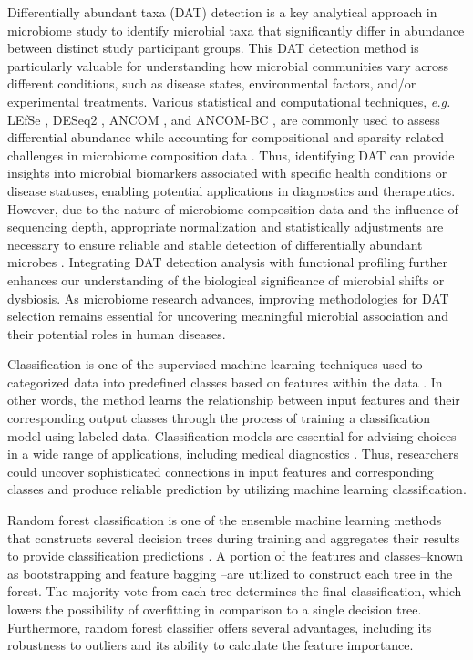 \documentclass[11pt, a4paper, onecolumn, oneside]{report}
\begin{document}
        Differentially abundant taxa (DAT) detection is a key analytical approach in microbiome study to identify microbial taxa that significantly differ in abundance between distinct study participant groups. This DAT detection method is particularly valuable for understanding how microbial communities vary across different conditions, such as disease states, environmental factors, and/or experimental treatments. Various statistical and computational techniques, \textit{e.g.} LEfSe \cite{LEfSe-1}, DESeq2 \cite{DESeq2-1}, ANCOM \cite{ANCOM-1}, and ANCOM-BC \cite{ANCOM-BC-1, ANCOM-BC-2}, are commonly used to assess differential abundance while accounting for compositional and sparsity-related challenges in microbiome composition data \cite{DAT-1, DAT-2}. Thus, identifying DAT can provide insights into microbial biomarkers associated with specific health conditions or disease statuses, enabling potential applications in diagnostics and therapeutics. However, due to the nature of microbiome composition data and the influence of sequencing depth, appropriate normalization and statistically adjustments are necessary to ensure reliable and stable detection of differentially abundant microbes \cite{DAT-3, DAT-4}. Integrating DAT detection analysis with functional profiling further enhances our understanding of the biological significance of microbial shifts or dysbiosis. As microbiome research advances, improving methodologies for DAT selection remains essential for uncovering meaningful microbial association and their potential roles in human diseases.

        Classification is one of the supervised machine learning techniques used to categorized data into predefined classes based on features within the data \cite{classification-1, classification-2}. In other words, the method learns the relationship between input features and their corresponding output classes through the process of training a classification model using labeled data. Classification models are essential for advising choices in a wide range of applications, including medical diagnostics \cite{classification-analysis-1}. Thus, researchers could uncover sophisticated connections in input features and corresponding classes and produce reliable prediction by utilizing machine learning classification.

        Random forest classification is one of the ensemble machine learning methods that constructs several decision trees during training and aggregates their results to provide classification predictions \cite{RF-1, RF-8}. A portion of the features and classes--known as bootstrapping \cite{RF-2, RF-3, RF-4} and feature bagging \cite{RF-5, RF-6, RF-7}--are utilized to construct each tree in the forest. The majority vote from each tree determines the final classification, which lowers the possibility of overfitting in comparison to a single decision tree. Furthermore, random forest classifier offers several advantages, including its robustness to outliers and its ability to calculate the feature importance.
\end{document}
